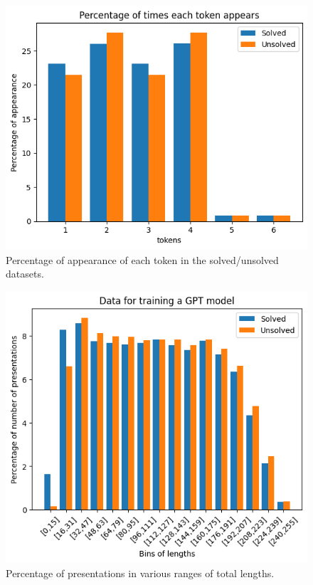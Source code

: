 \begin{figure}
	\centering
	\includegraphics[scale=0.6]{fig/tokens_hist.png}
	\caption{Percentage of appearance of each token in the solved/unsolved datasets.}
	\label{fig:tokens_hist}
\end{figure}


\begin{figure}
	\centering
	\includegraphics[scale=0.6]{fig/gpt_data_length_distribution.png}
	\caption{Percentage of presentations in various ranges of total lengths.
	}
	\label{fig:gpt_data}
\end{figure}







